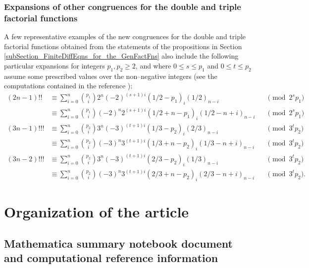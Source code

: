 \documentclass[12pt,reqno]{article}
\numberwithin{sfootnote}{section}
\numberwithin{equation}{section}
\theoremstyle{DefaultTheoremStyle}
\theoremstyle{definition}
\newcommand{\Pochhammer}[2]{\ensuremath{\left(#1\right)_{#2}}}
\begin{document}
\subsubsection{Expansions of other congruences for the 
               double and triple factorial functions} 
A few representative examples of the 
new congruences for the double and triple factorial 
functions obtained from the statements of the propositions in 
Section \ref{subSection_FiniteDiffEqns_for_the_GenFactFns} 
also include the following 
particular expansions for integers $p_1,p_2\geq 2$, and where 
$0 \leq s \leq p_1$ and $0 \leq t \leq p_2$ 
assume some prescribed values over the non--negative integers 
(see the computations contained in the reference \citep{SUMMARYNBREF-STUB}): 
\begin{align*} 
(2n-1)!! 
     & \equiv 
     \sum_{i=0}^{n} \binom{p_1}{i} 
     2^{n} (-2)^{(s+1)i} \Pochhammer{1/2-p_1}{i} \Pochhammer{1/2}{n-i} 
     && \pmod{2^{s} p_1} \\ 
     & \equiv 
     \sum_{i=0}^{n} \binom{p_1}{i} 
     (-2)^{n} 2^{(s+1)i} \Pochhammer{1/2+n-p_1}{i} 
     \Pochhammer{1/2-n+i}{n-i} 
     && \pmod{2^{s} p_1} \\ 
(3n-1)!!! 
     & \equiv 
     \sum_{i=0}^{n} \binom{p_2}{i} 
     3^{n} (-3)^{(t+1)i} \Pochhammer{1/3-p_2}{i} \Pochhammer{2/3}{n-i} 
     && \pmod{3^{t} p_2} \\ 
     & \equiv 
     \sum_{i=0}^{n} \binom{p_2}{i} 
     (-3)^{n} 3^{(t+1)i} \Pochhammer{1/3+n-p_2}{i} 
     \Pochhammer{1/3-n+i}{n-i} 
     && \pmod{3^{t} p_2} \\ 
(3n-2)!!! 
     & \equiv 
     \sum_{i=0}^{n} \binom{p_2}{i} 
     3^{n} (-3)^{(t+1)i} \Pochhammer{2/3-p_2}{i} \Pochhammer{1/3}{n-i} 
     && \pmod{3^{t} p_2} \\ 
     & \equiv 
     \sum_{i=0}^{n} \binom{p_2}{i} 
     (-3)^{n} 3^{(t+1)i} \Pochhammer{2/3+n-p_2}{i} 
     \Pochhammer{2/3-n+i}{n-i} 
     && \pmod{3^{t} p_2}. 
\end{align*} 

\section{Organization of the article} 

\subsection{Mathematica summary notebook document and 
            computational reference information} 
\label{subSection_MmSummaryNBInfo} 
\end{document}

